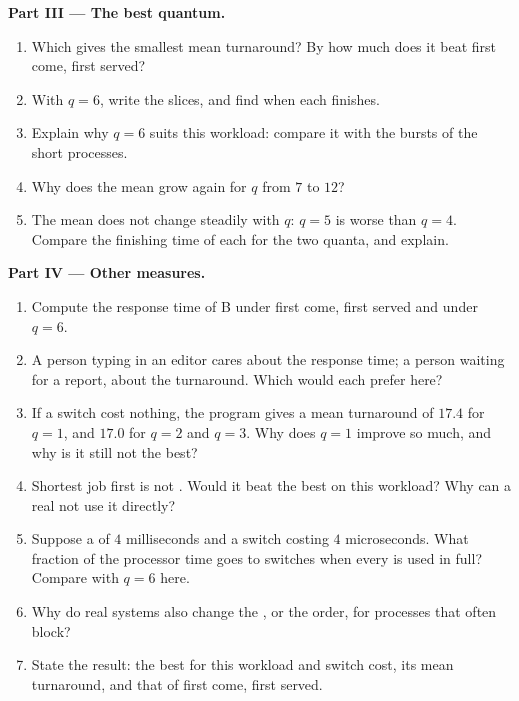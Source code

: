 \begin{problem}
\medskip\noindent\textbf{Part III --- The best quantum.}
\begin{enumerate}[resume]
  \item Which  gives the smallest mean turnaround? By how much does it beat first come, first served?
  \item With $q = 6$, write the slices, and find when each  finishes.
  \item Explain why $q = 6$ suits this workload: compare it with the bursts of the short processes.
  \item Why does the mean grow again for $q$ from $7$ to $12$?
  \item The mean does not change steadily with $q$: $q = 5$ is worse than $q = 4$. Compare the finishing time of each
     for the two quanta, and explain.
\end{enumerate}

\medskip\noindent\textbf{Part IV --- Other measures.}
\begin{enumerate}[resume]
  \item Compute the response time of B under first come, first served and under $q = 6$.
  \item A person typing in an editor cares about the response time; a person waiting for a report, about the
    turnaround. Which  would each prefer here?
  \item If a switch cost nothing, the program gives a mean turnaround of $17.4$ for $q = 1$, and $17.0$ for $q = 2$
    and $q = 3$. Why does $q = 1$ improve so much, and why is it still not the best?
  \item Shortest job first is not . Would it beat the best  on this workload? Why can a real
     not use it directly?
  \item Suppose a  of $4$ milliseconds and a switch costing $4$ microseconds. What fraction of the processor
    time goes to switches when every  is used in full? Compare with $q = 6$ here.
  \item Why do real systems also change the , or the order, for processes that often block?
  \item State the result: the best  for this workload and switch cost, its mean turnaround, and that of first
    come, first served.
\end{enumerate}
\end{problem}
